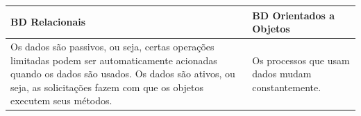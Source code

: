 \begin{quadro}[!htb]
    \centering
    \caption{Hierarquia de restrições das questões.}
    \label{qua_comparabd}
    \begin{tabular}{|p{7cm}|p{7cm}|}
        \hline
        \textbf{BD Relacionais}                                                                       & \textbf{BD Orientados a Objetos}                  \\
        \hline
        Os dados são passivos, ou seja, certas operações limitadas podem ser automaticamente acionadas quando os dados são usados.
        Os dados são ativos, ou seja, as solicitações fazem com que os objetos executem seus métodos. & Os processos que usam dados mudam constantemente. \\
        \hline
    \end{tabular}
\end{quadro}
